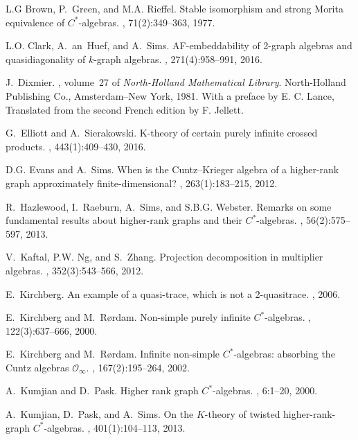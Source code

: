 \documentclass[a4paper, 12pt]{amsart}
\numberwithin{equation}{section}
\theoremstyle{remark}
\theoremstyle{definition}
\begin{document}
\begin{thebibliography}{10}
 L.G Brown, P.~Green, and M.A. Rieffel.
\newblock Stable isomorphism and strong {M}orita equivalence of
  {$C^*$}-algebras.
, 71(2):349--363, 1977.

 L.O. Clark, A.~an~Huef, and A.~Sims.
\newblock A{F}-embeddability of 2-graph algebras and quasidiagonality of
  {$k$}-graph algebras.
, 271(4):958--991, 2016.

 J.~Dixmier.
, volume~27 of {\em North-Holland
  Mathematical Library}.
\newblock North-Holland Publishing Co., Amsterdam--New York, 1981.
\newblock With a preface by E. C. Lance, Translated from the second French
  edition by F. Jellett.

 G.~Elliott and A.~Sierakowski.
\newblock K-theory of certain purely infinite crossed products.
, 443(1):409--430, 2016.

 D.G. Evans and A.~Sims.
\newblock When is the {C}untz--{K}rieger algebra of a higher-rank graph
  approximately finite-dimensional?
, 263(1):183--215, 2012.

 R.~Hazlewood, I.~Raeburn, A.~Sims, and S.B.G. Webster.
\newblock Remarks on some fundamental results about higher-rank graphs and
  their {$C^*$}-algebras.
, 56(2):575--597, 2013.

 V.~Kaftal, P.W. Ng, and S.~Zhang.
\newblock Projection decomposition in multiplier algebras.
, 352(3):543--566, 2012.

 E.~Kirchberg.
\newblock An example of a quasi-trace, which is not a 2-quasitrace.
, 2006.

 E.~Kirchberg and M.~R{\o}rdam.
\newblock Non-simple purely infinite {$C^*$}-algebras.
, 122(3):637--666, 2000.

 E.~Kirchberg and M.~R{\o}rdam.
\newblock Infinite non-simple {$C^*$}-algebras: absorbing the {C}untz algebras
  {$\mathcal O_\infty$}.
, 167(2):195--264, 2002.

 A.~Kumjian and D.~Pask.
\newblock Higher rank graph {$C^*$}-algebras.
, 6:1--20, 2000.

 A.~Kumjian, D.~Pask, and A.~Sims.
\newblock On the {$K$}-theory of twisted higher-rank-graph {$C^*$}-algebras.
, 401(1):104--113, 2013.


\end{thebibliography}
\end{document}
